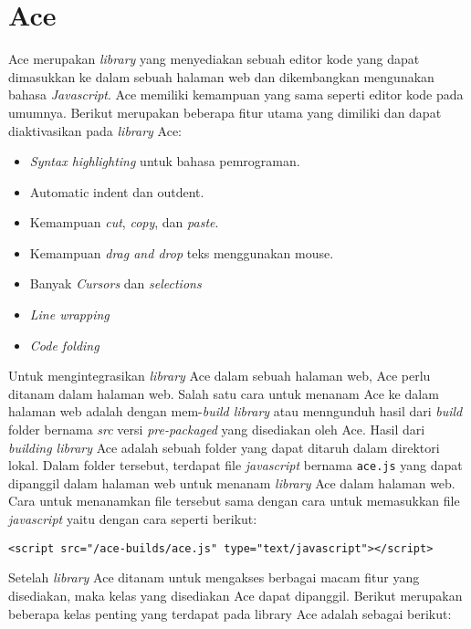 \section{Ace}
\label{sec:2:ace}

Ace merupakan \textit{library} yang menyediakan sebuah editor kode yang dapat dimasukkan ke dalam sebuah halaman web dan dikembangkan mengunakan bahasa \textit{Javascript}. Ace memiliki kemampuan yang sama seperti editor kode pada umumnya. Berikut merupakan beberapa fitur utama yang dimiliki dan dapat diaktivasikan pada \textit{library} Ace:

\begin{itemize}
	\item \textit{Syntax highlighting} untuk bahasa pemrograman.
	\item Automatic indent dan outdent.
	\item Kemampuan \textit{cut}, \textit{copy}, dan \textit{paste}.
	\item Kemampuan \textit{drag and drop} teks menggunakan mouse.
	\item Banyak \textit{Cursors} dan \textit{selections}
	\item \textit{Line wrapping}
	\item \textit{Code folding}
\end{itemize}

Untuk mengintegrasikan \textit{library} Ace dalam sebuah halaman web, Ace perlu ditanam dalam halaman web. Salah satu cara untuk menanam Ace ke dalam halaman web adalah dengan mem-\textit{build library} atau menngunduh hasil dari \textit{build} folder bernama \textit{src} versi \textit{pre-packaged} yang disediakan oleh Ace. Hasil dari \textit{building library} Ace adalah sebuah folder yang dapat ditaruh dalam direktori lokal. Dalam folder tersebut, terdapat file \textit{javascript} bernama \verb|ace.js| yang dapat dipanggil dalam halaman web untuk menanam \textit{library} Ace dalam halaman web. Cara untuk menanamkan file tersebut sama dengan cara untuk memasukkan file \textit{javascript} yaitu dengan cara seperti berikut:

\begin{center}
	\verb|<script src="/ace-builds/ace.js" type="text/javascript"></script>|
\end{center}

Setelah \textit{library} Ace ditanam untuk mengakses berbagai macam fitur yang disediakan, maka kelas yang disediakan Ace dapat dipanggil. Berikut merupakan beberapa kelas penting yang terdapat pada library Ace adalah sebagai berikut:

